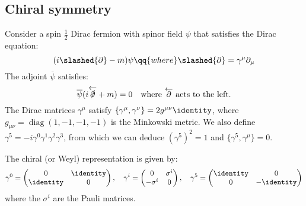 \documentclass{jknotes}
\begin{document}
\subsection{Chiral symmetry}
Consider a spin \(\frac{1}{2}\) Dirac fermion with spinor field \(\psi\) that satisfies the Dirac equation:
\begin{equation}
    (i\slashed{\partial}-m)\psi \qq{where} \slashed{\partial} = \gamma^\mu\partial_\mu
\end{equation}
The adjoint \(\overline{\psi}\) satisfies:
\begin{equation}
    \overline{\psi}(i\overleftarrow{\slashed{\partial}}+m)=0 \quad \text{where } \overleftarrow{\partial} \text{ acts to the left.}
\end{equation}
The Dirac matrices \(\gamma^\mu\) satisfy \(\{\gamma^\mu,\gamma^\nu\}=2g^{\mu\nu}\identity\), where \(g_{\mu\nu}=\operatorname{diag}(1,-1,-1,-1)\) is the Minkowski metric. We also define \(\gamma^5=-i\gamma^0\gamma^1\gamma^2\gamma^3\), from which we can deduce \(\left( \gamma^5 \right)^2=1\) and \(\{\gamma^5,\gamma^\mu\}=0\).

The chiral (or Weyl) representation is given by:
\begin{equation}
    \gamma^0 = 
    \begin{pmatrix}
        0 & \identity \\
        \identity & 0
    \end{pmatrix}, \quad
    \gamma^i =
    \begin{pmatrix}
        0 & \sigma^i \\
        -\sigma^i & 0
    \end{pmatrix}, \quad
    \gamma^5 = 
    \begin{pmatrix}
        \identity & 0 \\
        0 & -\identity
    \end{pmatrix}
\end{equation}
where the \(\sigma^i\) are the Pauli matrices.
\end{document}

